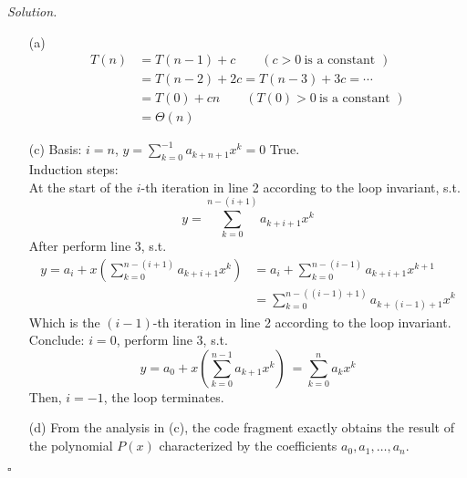 \documentclass[11pt]{article}
\theoremstyle{definition}
\newenvironment{solution}{\noindent\emph{Solution.}}{\hfill$\square$}
\newcommand\tab[1][1cm]{\hspace*{#1}}
\begin{document}
\begin{solution}
 \begin{enumerate}
    \item[(a)] 
    \begin{align*}
    T(n) &= T(n-1) + c \qquad (c > 0 \ \mbox{is a constant })\\
    &= T(n-2) + 2c = T(n-3) + 3c = \cdots \\
    &= T(0) + cn \qquad (T(0) > 0 \ \mbox{is a constant }) \\
    &= \Theta(n)
    \end{align*}
   
    \item[(c)]
    Basis: $i = n$, $y = \sum_{k = 0}^{-1}a_{k+n+1}x^k = 0$ True.\\
    Induction steps: \\
    \tab At the start of the $i$-th iteration in line 2 according to the loop invariant, s.t.
    $$y = \sum_{k=0}^{n-(i+1)}a_{k+i+1}x^k$$
    \tab After perform line 3, s.t.
     \begin{align*}
     y = a_i + x \left( \sum_{k=0}^{n-(i+1)}a_{k+i+1}x^k \right) &= a_i + \sum_{k=0}^{n-(i-1)}a_{k+i+1}x^{k+1} \\
     &= \sum_{k=0}^{n-((i-1)+1)}a_{k+(i-1)+1}x^k
     \end{align*}
     \tab Which is the $(i-1)$-th iteration in line 2 according to the loop invariant.\\
     Conclude: $i = 0$, perform line 3, s.t.
     $$y = a_0 + x \left( \sum_{k=0}^{n-1}a_{k+1}x^k \right)\ = \sum_{k=0}^{n}a_{k}x^k$$
    \tab Then, $i=-1$, the loop terminates.
    \item[(d)]
    From the analysis in (c), the code fragment exactly obtains the result of the polynomial $P(x)$ characterized by the coefficients $a_0, a_1, \ldots, a_n$.
    
    
    
  \end{enumerate}
\end{solution}
\end{document}
